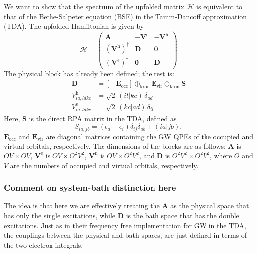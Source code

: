 We want to show that the spectrum of the upfolded matrix $\bm{\mathcal{H}}$ is equivalent to that of the Bethe-Salpeter equation (BSE) in the Tamm-Dancoff approximation (TDA). The upfolded Hamiltonian is given by
\begin{equation}
\mathcal{H}=
\begin{pmatrix}
\mathbf{A} & -\mathbf{V}^{\mathrm{e}} & -\mathbf{V}^{\mathrm{h}} \\
\left(\mathbf{V}^{\mathrm{h}}\right)^{\dagger} & \mathbf{D} & \mathbf{0} \\
\left(\mathbf{V}^{\mathrm{e}}\right)^{\dagger} & \mathbf{0} & \mathbf{D}
\end{pmatrix}
\end{equation}
The physical block has already been defined; the rest is:
\begin{align}
\mathbf{D} &= \left[-\boldsymbol{E}_{\mathrm{occ}}\right] \oplus_{\text{kron}} \boldsymbol{E}_{\mathrm{vir}} \oplus_{\text{kron}} \mathbf{S} \\
V_{ia,ldkc}^{\mathrm{h}} &= \sqrt{2}\,(il|kc)\,\delta_{ad} \\
V_{ia,ldkc}^{\mathrm{e}} &= \sqrt{2}\,(kc|ad)\,\delta_{il}
\end{align}
Here, $\mathbf{S}$ is the direct RPA matrix in the TDA, defined as
\begin{equation}
S_{ia,jb} = \left( \epsilon_a - \epsilon_i \right) \delta_{ij} \delta_{ab} + (ia|jb),\end{equation}
$\boldsymbol{E}_{\mathrm{occ}}$ and $\boldsymbol{E}_{\mathrm{vir}}$ are diagonal matrices containing the GW QPEs of the occupied and virtual orbitals, respectively.  The dimensions of the blocks are as follows: $\mathbf{A}$ is $OV \times OV$, $\mathbf{V}^{\mathrm{e}}$ is $OV \times O^2V^2$, $\mathbf{V}^{\mathrm{h}}$ is $OV \times O^2V^2$, and $\mathbf{D}$ is $O^2V^2 \times O^2V^2$, where $O$ and $V$ are the numbers of occupied and virtual orbitals, respectively. 

\subsubsection{Comment on system-bath distinction here}
The idea is that here we are effectively treating the $\bm{A}$ as the physical space that has only the single excitations, while $\bm{D}$ is the bath space that has the double excitations. Just as in their frequency free implementation for GW in the TDA, the couplings between the physical and bath spaces, are just defined in terms of the two-electron integrals.


